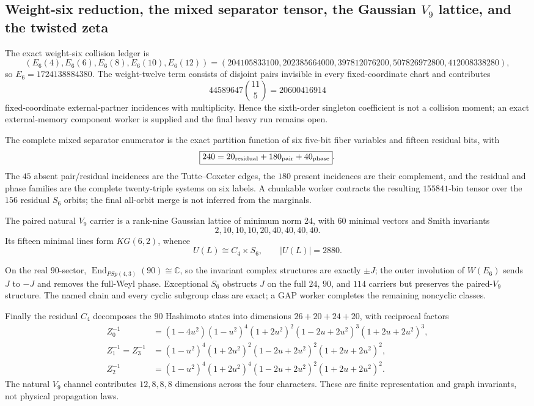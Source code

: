 \subsection{Weight-six reduction, the mixed separator tensor, the Gaussian $V_9$ lattice, and the twisted zeta}
\label{subsec:bt1902-1906-five-frontiers}
The exact weight-six collision ledger is
\[
(E_6(4),E_6(6),E_6(8),E_6(10),E_6(12))=(204105833100,202385664000,397812076200,507826972800,412008338280),
\]
so $E_6=1724138884380$.  The weight-twelve term consists of disjoint pairs invisible in every fixed-coordinate chart and contributes
\[
44589647\binom{11}{5}=20600416914
\]
fixed-coordinate external-partner incidences with multiplicity.  Hence the sixth-order singleton coefficient is not a collision moment; an exact external-memory component worker is supplied and the final heavy run remains open.

The complete mixed separator enumerator is the exact partition function of six five-bit fiber variables and fifteen residual bits, with
\[
\boxed{240=20_{\rm residual}+180_{\rm pair}+40_{\rm phase}}.
\]
The $45$ absent pair/residual incidences are the Tutte--Coxeter edges, the $180$ present incidences are their complement, and the residual and phase families are the complete twenty-triple systems on six labels.  A chunkable worker contracts the resulting $155841$-bin tensor over the $156$ residual $S_6$ orbits; the final all-orbit merge is not inferred from the marginals.

The paired natural $V_9$ carrier is a rank-nine Gaussian lattice of minimum norm $24$, with $60$ minimal vectors and Smith invariants
\[
2,10,10,10,20,40,40,40,40.
\]
Its fifteen minimal lines form $KG(6,2)$, whence
\[
\boxed{U(L)\cong C_4\times S_6,\qquad |U(L)|=2880.}
\]

On the real $90$-sector, $\operatorname{End}_{PSp(4,3)}(90)\cong\mathbb C$, so the invariant complex structures are exactly $\pm J$; the outer involution of $W(E_6)$ sends $J$ to $-J$ and removes the full-Weyl phase.  Exceptional $S_6$ obstructs $J$ on the full $24$, $90$, and $114$ carriers but preserves the paired-$V_9$ structure.  The named chain and every cyclic subgroup class are exact; a GAP worker completes the remaining noncyclic classes.

Finally the residual $C_4$ decomposes the $90$ Hashimoto states into dimensions $26+20+24+20$, with reciprocal factors
\[
\begin{aligned}
Z_0^{-1}&=(1-4u^2)(1-u^2)^4(1+2u^2)^2(1-2u+2u^2)^3(1+2u+2u^2)^3,\\
Z_1^{-1}=Z_3^{-1}&=(1-u^2)^4(1+2u^2)^2(1-2u+2u^2)^2(1+2u+2u^2)^2,\\
Z_2^{-1}&=(1-u^2)^4(1+2u^2)^4(1-2u+2u^2)^2(1+2u+2u^2)^2.
\end{aligned}
\]
The natural $V_9$ channel contributes $12,8,8,8$ dimensions across the four characters.  These are finite representation and graph invariants, not physical propagation laws.
